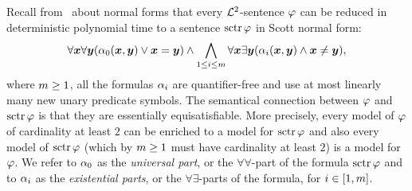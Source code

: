 Recall from~ about normal forms that every $\mathcal{L}^{2}$-sentence
$\varphi$ can be reduced in deterministic polynomial time to a sentence
$\operatorname{sctr}\varphi$ in Scott normal form:
\[
  \forall\bm{x}\forall\bm{y} (\alpha_{0}(\bm{x},\bm{y}) \lor \bm{x} = \bm{y}) \land
  \bigwedge_{1 \leq i \leq m} \forall\bm{x}\exists\bm{y}(
  \alpha_{i}(\bm{x},\bm{y}) \land \bm{x} \neq \bm{y}),
\]
where $m \geq 1$, all the formulas $\alpha_{i}$ are quantifier-free and use at
most linearly many new unary predicate symbols.
The semantical connection between $\varphi$ and $\operatorname{sctr}\varphi$ is that they are
essentially equisatisfiable. More precisely, every model of $\varphi$ of
cardinality at least $2$ can be enriched to a model for $\operatorname{sctr}\varphi$ and also
every model of $\operatorname{sctr}\varphi$ (which by $m \geq 1$ must have cardinality at
least $2$) is a model for $\varphi$.
We refer to $\alpha_{0}$ as the \emph{universal part}, or the $\forall\forall$-part
of the formula $\operatorname{sctr}\varphi$ and to $\alpha_{i}$ as the \emph{existential parts},
or the $\forall\exists$-parts of the formula, for $i \in [1,m]$.

